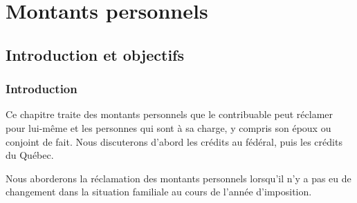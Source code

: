 \chapter{Montants personnels}
\section{Introduction et objectifs}
\subsection{Introduction}
Ce chapitre traite des montants personnels que le contribuable peut réclamer pour lui-même et les personnes qui sont à sa charge, y compris son époux ou conjoint de fait. Nous discuterons d'abord les crédits au fédéral, puis les crédits du Québec. 

Nous aborderons la réclamation des montants personnels lorsqu'il n'y a pas eu de changement dans la situation familiale au cours de l'année d'imposition.


